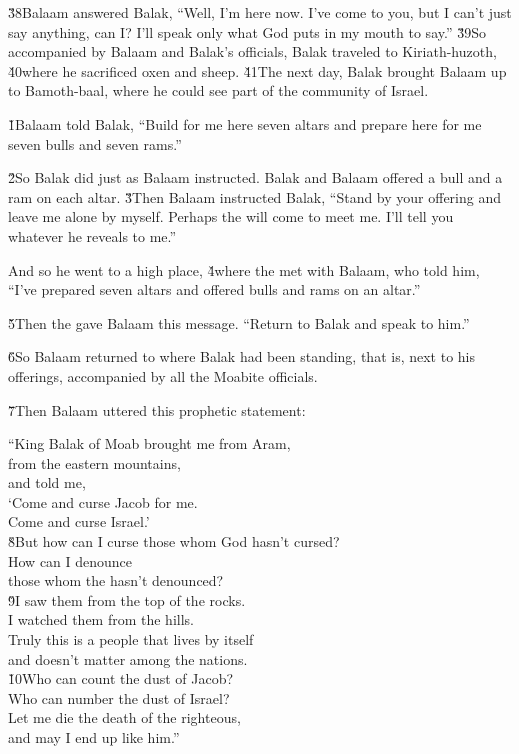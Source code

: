 \v{38}Balaam answered Balak, ``Well, I'm here now. I've come to you, but I can't just say anything, can I? I'll speak only what God puts in my mouth to say.'' \v{39}So accompanied by Balaam and Balak's officials, Balak traveled to Kiriath-huzoth, \v{40}where he sacrificed oxen and sheep. \v{41}The next day, Balak brought Balaam up to Bamoth-baal, where he could see part of the community of Israel.

\v{1}Balaam told Balak, ``Build for me here seven altars and prepare here for me seven bulls and seven rams.''

\v{2}So Balak did just as Balaam instructed. Balak and Balaam offered a bull and a ram on each altar. \v{3}Then Balaam instructed Balak, ``Stand by your offering and leave me alone by myself. Perhaps the  will come to meet me. I'll tell you whatever he reveals to me.''

And so he went to a high place, \v{4}where the  met with Balaam, who told him, ``I've prepared seven altars and offered bulls and rams on an altar.''

\v{5}Then the  gave Balaam this message. ``Return to Balak and speak to him.''

\v{6}So Balaam returned to where Balak had been standing, that is, next to his offerings, accompanied by all the Moabite officials.

\v{7}Then Balaam uttered this prophetic statement:

\begin{poetry}
\poeml ``King Balak of Moab brought me from Aram, \\
\poemll    from the eastern mountains, \\
\poemlll       and told me, \\
\poeml `Come and curse Jacob for me. \\
\poemll    Come and curse Israel.' \\
\poeml \v{8}But how can I curse those whom God hasn't cursed? \\
\poemll    How can I denounce \\
\poemlll       those whom the  hasn't denounced? \\
\poeml \v{9}I saw them from the top of the rocks. \\
\poemll    I watched them from the hills. \\
\poeml Truly this is a people that lives by itself \\
\poemll    and doesn't matter among the nations. \\
\poeml \v{10}Who can count the dust of Jacob? \\
\poemll    Who can number the dust of Israel? \\
\poeml Let me die the death of the righteous, \\
\poemll    and may I end up like him.''
\end{poetry}

